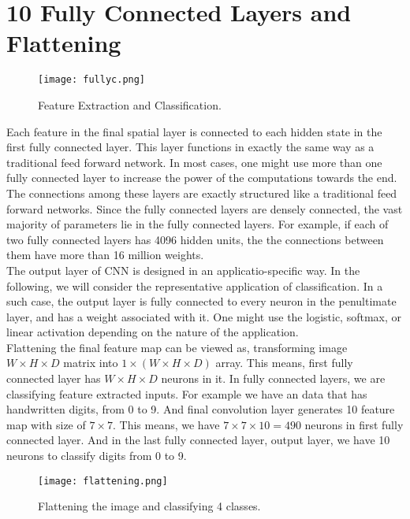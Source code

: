 \documentclass[11pt]{article}
\begin{document}
\section{10 Fully Connected Layers and Flattening}
\begin{figure}[H]
\centering
\texttt{[image: fullyc.png]}
\caption{Feature Extraction and Classification.}
\label{fig:figure3}
\end{figure}
Each feature in the final spatial layer is connected to each hidden state in the first fully connected layer. This layer functions in exactly the same way as a traditional feed forward network. In most cases, one might use more than one fully connected layer to increase the power of the computations towards the end. The connections among these layers are exactly structured like a traditional feed forward networks. Since the fully connected layers are densely connected, the vast majority of parameters lie in the fully connected layers. For example, if each of two fully connected layers has 4096 hidden units, the the connections between them have more than 16 million weights. \\
The output layer of CNN is designed in an applicatio-specific way. In the following, we will consider the representative application of classification. In a such case, the output layer is fully connected to every neuron in the penultimate layer, and has a weight associated with it. One might use the logistic, softmax, or linear activation depending on the nature of the application.\\
Flattening the final feature map can be viewed as, transforming image $W \times H \times D$ matrix into $ 1 \times (W \times H \times D)$ array. This means, first fully connected layer has $W \times H \times D$ neurons in it. In fully connected layers, we are classifying feature extracted inputs. For example we have an data that has handwritten digits, from 0 to 9. And final convolution layer generates 10 feature map with size of $7\times7$. This means, we have $7\times7\times10 = 490$ neurons in first fully connected layer. And in the last fully connected layer, output layer, we have 10 neurons to classify digits from 0 to 9. 

\begin{figure}[H]
\centering
\texttt{[image: flattening.png]}
\caption{Flattening the image and classifying 4 classes.}
\label{fig:figure3}
\end{figure}
\end{document}
